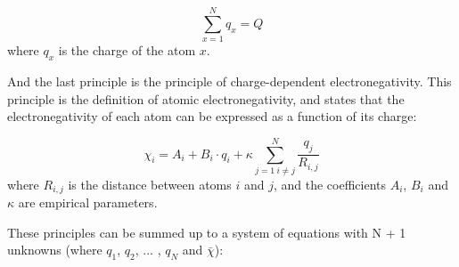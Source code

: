 \begin{equation}
    \sum^N_{x=1} q_x = Q
\end{equation}
where $q_x$ is the charge of the atom $x$.

And the last principle is the principle of charge-dependent electronegativity.
This principle is the definition of atomic electronegativity, and states that
the electronegativity of each atom can be expressed as a function of its charge: 

\begin{equation} \label{eq:eem0}
    \chi_i = A_i + B_i \cdot q_i + \kappa \sum^N_{j=1 \: i\neq{j}} \frac{q_j}{R_{i,j}} 
\end{equation}
where $R_{i,j}$ is the distance between atoms $i$ and $j$, and the coefficients
$A_i$, $B_i$ and $\kappa$ are empirical parameters. 

These principles can be summed up to a system of equations with N + 1 unknowns
(where $q_1$, $q_2$, ... , $q_N$ and $\bar{\chi}$):

